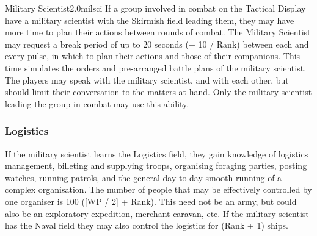\begin{skill}{Military Scientist}{2.0}{milsci}
If a group involved in combat on the Tactical Display have a military
scientist with the Skirmish field leading them, they may have more
time to plan their actions between rounds of combat.  The Military
Scientist may request a break period of up to 20 seconds (+ 10 / Rank)
between each and every pulse, in which to plan their actions and those
of their companions.  This time simulates the orders and pre-arranged
battle plans of the military scientist. The players may speak with the
military scientist, and with each other, but should limit their
conversation to the matters at hand. Only the military scientist
leading the group in combat may use this ability.

\subsubsection{Logistics}

If the military scientist learns the Logistics field, they gain
knowledge of logistics management, billeting and supplying troops,
organising foraging parties, posting watches, running patrols, and the
general day-to-day smooth running of a complex organisation. The
number of people that may be effectively controlled by one organiser
is 100 \x ([WP / 2] + Rank). This need not be an army, but could also
be an exploratory expedition, merchant caravan, etc. If the military
scientist has the Naval field they may also control the logistics for
(Rank + 1) ships.
\end{skill}
